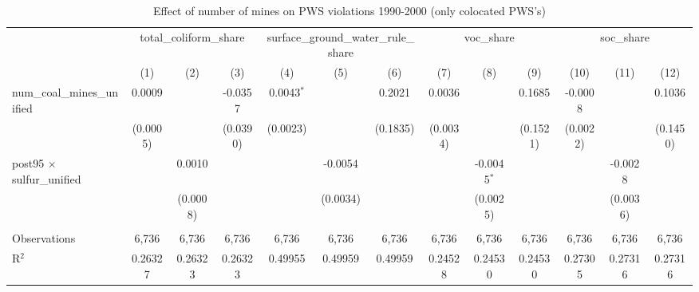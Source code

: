 
\begin{table}[htbp]
   \caption{\label{olsrf2sls_nummine_non_mine_vio_1990to2000colocate_coalunified} Effect of number of mines on PWS violations 1990-2000 (only colocated PWS's)}
   \bigskip
   \centering
   \begin{adjustbox}{width = \textwidth, center}
      \begin{tabular}{lcccccccccccc}
         \toprule
          & \multicolumn{3}{c}{total\_coliform\_share} & \multicolumn{3}{c}{surface\_ground\_water\_rule\_share} & \multicolumn{3}{c}{voc\_share} & \multicolumn{3}{c}{soc\_share}\\
                                                          & (1)           & (2)           & (3)           & (4)           & (5)           & (6)           & (7)           & (8)           & (9)           & (10)                  & (11)          & (12)\\  
         \midrule 
         num\_coal\_mines\_unified                        & 0.0009        &               & -0.0357       & 0.0043$^{*}$  &               & 0.2021        & 0.0036        &               & 0.1685        & -0.0008               &               & 0.1036\\   
                                                          & (0.0005)      &               & (0.0390)      & (0.0023)      &               & (0.1835)      & (0.0034)      &               & (0.1521)      & (0.0022)              &               & (0.1450)\\   
         post95 $\times$ sulfur\_unified                  &               & 0.0010        &               &               & -0.0054       &               &               & -0.0045$^{*}$ &               &                       & -0.0028       &   \\   
                                                          &               & (0.0008)      &               &               & (0.0034)      &               &               & (0.0025)      &               &                       & (0.0036)      &   \\   
          \\
         Observations                                     & 6,736         & 6,736         & 6,736         & 6,736         & 6,736         & 6,736         & 6,736         & 6,736         & 6,736         & 6,736                 & 6,736         & 6,736\\  
         R$^2$                                            & 0.26327       & 0.26323       & 0.26323       & 0.49955       & 0.49959       & 0.49959       & 0.24528       & 0.24530       & 0.24530       & 0.27305               & 0.27316       & 0.27316\\  

\end{tabular}
\end{adjustbox}
\end{table}
